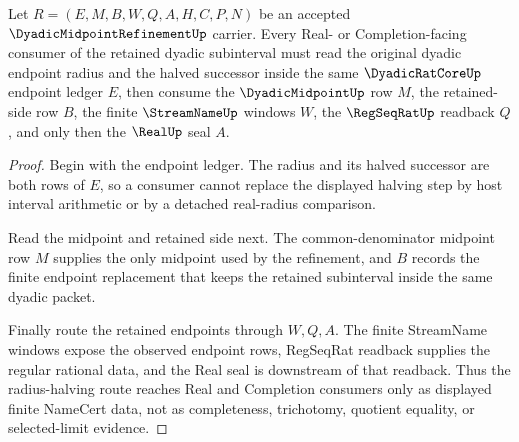 \begin{theorem}
\label{thm:dyadic-midpoint-refinement-radius-halving}
Let $R=(E,M,B,W,Q,A,H,C,P,N)$ be an accepted $\DyadicMidpointRefinementUp$ carrier. Every Real- or Completion-facing consumer of the retained dyadic subinterval must read the original dyadic endpoint radius and the halved successor inside the same $\DyadicRatCoreUp$ endpoint ledger $E$, then consume the $\DyadicMidpointUp$ row $M$, the retained-side row $B$, the finite $\StreamNameUp$ windows $W$, the $\RegSeqRatUp$ readback $Q$, and only then the $\RealUp$ seal $A$.
\end{theorem}
\begin{proof}
Begin with the endpoint ledger. The radius and its halved successor are both rows of $E$, so a consumer cannot replace the displayed halving step by host interval arithmetic or by a detached real-radius comparison.

Read the midpoint and retained side next. The common-denominator midpoint row $M$ supplies the only midpoint used by the refinement, and $B$ records the finite endpoint replacement that keeps the retained subinterval inside the same dyadic packet.

Finally route the retained endpoints through $W,Q,A$. The finite StreamName windows expose the observed endpoint rows, RegSeqRat readback supplies the regular rational data, and the Real seal is downstream of that readback. Thus the radius-halving route reaches Real and Completion consumers only as displayed finite NameCert data, not as completeness, trichotomy, quotient equality, or selected-limit evidence.
\end{proof}




